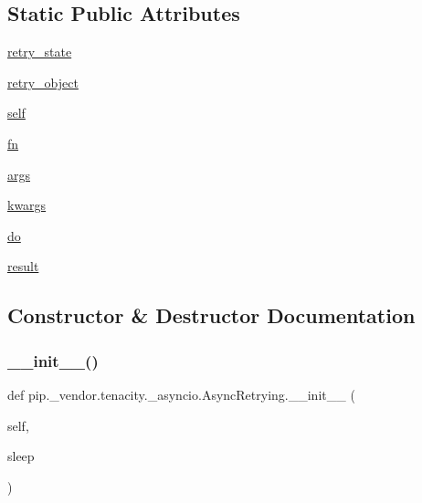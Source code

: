\subsection*{Static Public Attributes}
\begin{DoxyCompactItemize}
\item 
\hyperlink{classpip_1_1__vendor_1_1tenacity_1_1__asyncio_1_1AsyncRetrying_a845586cc2fb346c962bbb0d0407e7d47}{retry\+\_\+state}
\item 
\hyperlink{classpip_1_1__vendor_1_1tenacity_1_1__asyncio_1_1AsyncRetrying_a1e564edc36344cff7290f4c88caaeac9}{retry\+\_\+object}
\item 
\hyperlink{classpip_1_1__vendor_1_1tenacity_1_1__asyncio_1_1AsyncRetrying_a19ae657cf1ee36b4cb6bcb35bfe27793}{self}
\item 
\hyperlink{classpip_1_1__vendor_1_1tenacity_1_1__asyncio_1_1AsyncRetrying_aec2b5693228e913da90458cfec9a3e02}{fn}
\item 
\hyperlink{classpip_1_1__vendor_1_1tenacity_1_1__asyncio_1_1AsyncRetrying_ae223c19bb40b914a607b0ba8e5281eec}{args}
\item 
\hyperlink{classpip_1_1__vendor_1_1tenacity_1_1__asyncio_1_1AsyncRetrying_ac9e15395b220c8669dfd2c27f54f9083}{kwargs}
\item 
\hyperlink{classpip_1_1__vendor_1_1tenacity_1_1__asyncio_1_1AsyncRetrying_afdf873852160091be40336a36a95f780}{do}
\item 
\hyperlink{classpip_1_1__vendor_1_1tenacity_1_1__asyncio_1_1AsyncRetrying_ad7698660c874031990f18f5b998836cc}{result}
\end{DoxyCompactItemize}


\subsection{Constructor \& Destructor Documentation}
\mbox{\label{classpip_1_1__vendor_1_1tenacity_1_1__asyncio_1_1AsyncRetrying_a5b1bef8f976522a92769c8dd2091e1a7}} 
\subsubsection{\texorpdfstring{\+\_\+\+\_\+init\+\_\+\+\_\+()}{\_\_init\_\_()}}
{\footnotesize\ttfamily def pip.\+\_\+vendor.\+tenacity.\+\_\+asyncio.\+Async\+Retrying.\+\_\+\+\_\+init\+\_\+\+\_\+ (\begin{DoxyParamCaption}\item[{}]{self,  }\item[{}]{sleep }\end{DoxyParamCaption})}



